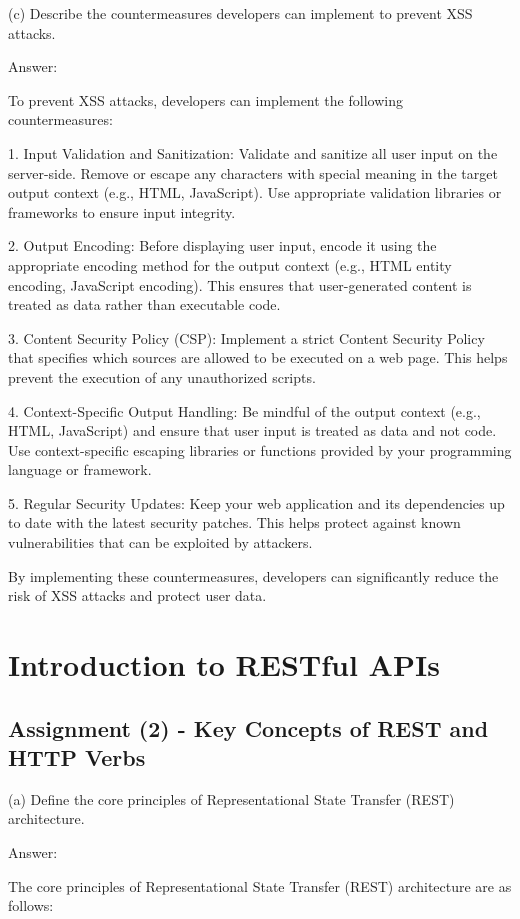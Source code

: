 \documentclass{article}
\begin{document}
(c) Describe the countermeasures developers can implement to prevent XSS attacks.

Answer:

To prevent XSS attacks, developers can implement the following countermeasures:

1. Input Validation and Sanitization: Validate and sanitize all user input on the server-side. Remove or escape any characters with special meaning in the target output context (e.g., HTML, JavaScript). Use appropriate validation libraries or frameworks to ensure input integrity.

2. Output Encoding: Before displaying user input, encode it using the appropriate encoding method for the output context (e.g., HTML entity encoding, JavaScript encoding). This ensures that user-generated content is treated as data rather than executable code.

3. Content Security Policy (CSP): Implement a strict Content Security Policy that specifies which sources are allowed to be executed on a web page. This helps prevent the execution of any unauthorized scripts.

4. Context-Specific Output Handling: Be mindful of the output context (e.g., HTML, JavaScript) and ensure that user input is treated as data and not code. Use context-specific escaping libraries or functions provided by your programming language or framework.

5. Regular Security Updates: Keep your web application and its dependencies up to date with the latest security patches. This helps protect against known vulnerabilities that can be exploited by attackers.

By implementing these countermeasures, developers can significantly reduce the risk of XSS attacks and protect user data.

\section*{Introduction to RESTful APIs}

\subsection*{Assignment (2) - Key Concepts of REST and HTTP Verbs}

(a) Define the core principles of Representational State Transfer (REST) architecture.

Answer:

The core principles of Representational State Transfer (REST) architecture are as follows:
\end{document}
